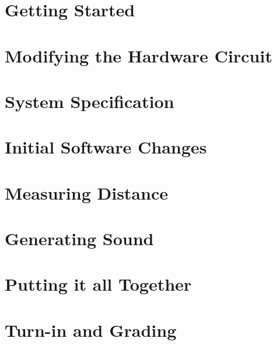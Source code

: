     \section{Getting Started} \label{sec:GettingStarted}                

    \section{Modifying the Hardware Circuit} \label{sec:hardwareMods}   

    \section{System Specification} \label{sec:spec}                     

    \section{Initial Software Changes} \label{sec:initialSoftware}      


    \section{Measuring Distance} \label{sec:distance}                   

    \section{Generating Sound} \label{sec:sound}                        

    \section{Putting it all Together} \label{sec:integration}           

    \section{Turn-in and Grading}                                       

